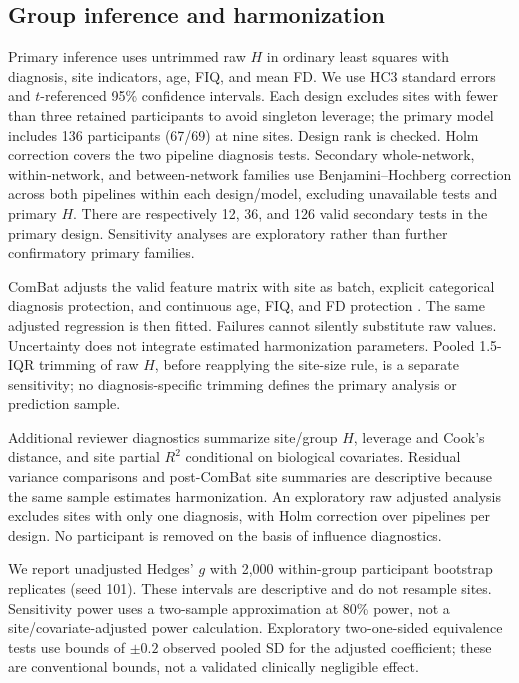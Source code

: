 \documentclass[10pt,letterpaper]{article}
\begin{document}
\subsection*{Group inference and harmonization}
Primary inference uses untrimmed raw $H$ in ordinary least squares with diagnosis,
site indicators, age, FIQ, and mean FD. We use HC3 standard errors and
$t$-referenced 95\% confidence intervals. Each design excludes sites with fewer
than three retained participants to avoid singleton leverage; the primary model
includes 136 participants (67/69) at nine sites. Design rank is checked.
Holm correction covers the two pipeline diagnosis tests. Secondary whole-network,
within-network, and between-network families use Benjamini--Hochberg correction
across both pipelines within each design/model, excluding unavailable tests and
primary $H$. There are respectively 12, 36, and 126 valid secondary tests in the
primary design. Sensitivity analyses are exploratory rather than further
confirmatory primary families.

ComBat adjusts the valid feature matrix with site as batch, explicit categorical
diagnosis protection, and continuous age, FIQ, and FD protection
\cite{Johnson2007,Fortin:2018neurocomBat}. The same adjusted regression is then fitted.
Failures cannot silently substitute raw values. Uncertainty does not integrate
estimated harmonization parameters. Pooled 1.5-IQR trimming of raw $H$, before
reapplying the site-size rule, is a separate sensitivity; no diagnosis-specific
trimming defines the primary analysis or prediction sample.

Additional reviewer diagnostics summarize site/group $H$, leverage and Cook's
distance, and site partial $R^2$ conditional on biological covariates. Residual
variance comparisons and post-ComBat site summaries are descriptive because the
same sample estimates harmonization. An exploratory raw adjusted analysis excludes
sites with only one diagnosis, with Holm correction over pipelines per design.
No participant is removed on the basis of influence diagnostics.

We report unadjusted Hedges' $g$ with 2,000 within-group participant bootstrap
replicates (seed 101). These intervals are descriptive and do not resample sites.
Sensitivity power uses a two-sample approximation at 80\% power, not a
site/covariate-adjusted power calculation. Exploratory two-one-sided equivalence
tests use bounds of $\pm0.2$ observed pooled SD for the adjusted coefficient;
these are conventional bounds, not a validated clinically negligible effect.
\end{document}
